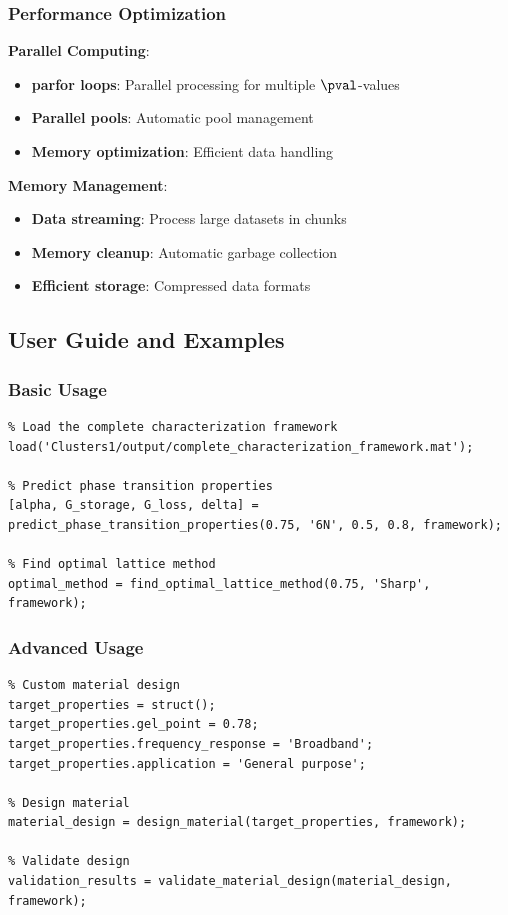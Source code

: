 \subsubsection{Performance Optimization}
\textbf{Parallel Computing}:
\begin{itemize}
    \item \textbf{parfor loops}: Parallel processing for multiple $\pval$-values
    \item \textbf{Parallel pools}: Automatic pool management
    \item \textbf{Memory optimization}: Efficient data handling
\end{itemize}

\textbf{Memory Management}:
\begin{itemize}
    \item \textbf{Data streaming}: Process large datasets in chunks
    \item \textbf{Memory cleanup}: Automatic garbage collection
    \item \textbf{Efficient storage}: Compressed data formats
\end{itemize}

\subsection{User Guide and Examples}

\subsubsection{Basic Usage}
\begin{verbatim}
% Load the complete characterization framework
load('Clusters1/output/complete_characterization_framework.mat');

% Predict phase transition properties
[alpha, G_storage, G_loss, delta] = predict_phase_transition_properties(0.75, '6N', 0.5, 0.8, framework);

% Find optimal lattice method
optimal_method = find_optimal_lattice_method(0.75, 'Sharp', framework);
\end{verbatim}

\subsubsection{Advanced Usage}
\begin{verbatim}
% Custom material design
target_properties = struct();
target_properties.gel_point = 0.78;
target_properties.frequency_response = 'Broadband';
target_properties.application = 'General purpose';

% Design material
material_design = design_material(target_properties, framework);

% Validate design
validation_results = validate_material_design(material_design, framework);
\end{verbatim}

